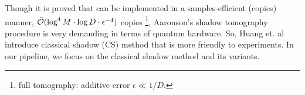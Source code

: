 \documentclass[
aps,
pra,
twocolumn,
floatfix,
]{revtex4-2}
\theoremstyle{plain}
\newtheorem{theorem}{Theorem}
\theoremstyle{definition}
\newtheorem{remark}{Remark}
\begin{document}
Though it is proved that  can be implemented in a samples-efficient (copies) manner, 
$\tilde{\mathcal{O}}(\log^4 M\cdot \log D\cdot\epsilon^{-4})$ copies \cite{aaronsonShadowTomographyQuantum2018}
\footnote{full tomography: additive error $\epsilon\ll 1/D$.},
Aaronson's shadow tomography procedure is very demanding in terms of quantum hardware.
So, Huang et. al \cite{huangPredictingManyProperties2020} introduce classical shadow (CS) method that is more friendly to experiments.
In our pipeline, we focus on the classical shadow method and its variants.
\end{document}
